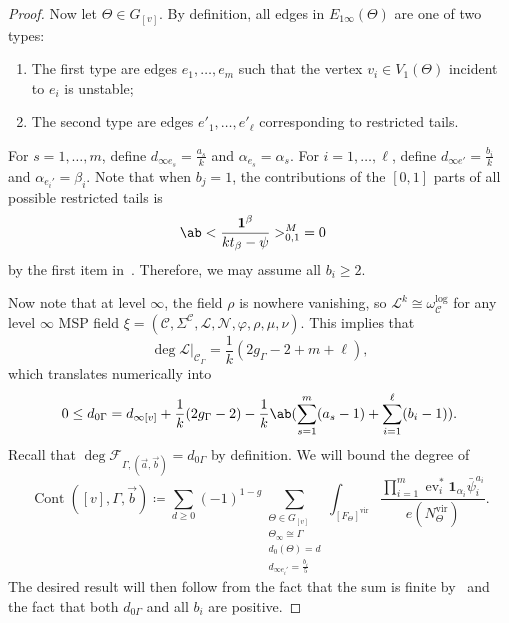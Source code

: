 \documentclass[10pt]{amsart}
\theoremstyle{definition}
\theoremstyle{remark}
\theoremstyle{plain}
\theoremstyle{definition}
\theoremstyle{remark}
\newcommand{\msc}[1]{\mathscr{#1}}
\newcommand{\mr}[1]{\mathrm{#1}}
\newcommand{\1}{\mathbf{1}}
\newcommand{\2}{\mathbf{2}}
\newcommand{\3}{\mathbf{3}}
\newcommand{\vir}{\mr{vir}}
\DeclareMathOperator{\ev}{ev}
\DeclareMathOperator{\Cont}{Cont}
\numberwithin{equation}{section}
\begin{document}
\begin{proof}
Now let $\Theta \in G_{[v]}$. By definition, all edges in $E_{1\infty}(\Theta)$ are one of two types:
\begin{enumerate}
    \item The first type are edges $e_1, \ldots, e_m$ such that the vertex $v_i \in V_1(\Theta)$ incident to $e_i$ is unstable;
    \item The second type are edges $e'_1, \ldots, e'_{\ell}$ corresponding to restricted tails.
\end{enumerate}

For $s=1, \ldots, m$, define $d_{\infty e_s} = \frac{a_s}{k}$ and $\alpha_{e_s} = \alpha_s$. For $i = 1, \ldots, \ell$, define $d_{\infty e'} = \frac{b_i}{k}$ and $\alpha_{e_i'} = \beta_i$. Note that when $b_j = 1$, the contributions of the $[0,1]$ parts of all possible restricted tails is
\begin{align*}
    \ab<\frac{\1^{\beta}}{k t_{\beta} - \psi}>_{0,1}^M  
    &= 0
\end{align*}
by the first item in~. Therefore, we may assume all $b_i \geq 2$.

Now note that at level $\infty$, the field $\rho$ is nowhere vanishing, so $\msc{L}^k \cong \omega_{\msc{C}}^{\log}$ for any level $\infty$ MSP field $\xi = (\msc{C}, \Sigma^{\msc{C}}, \msc{L}, \msc{N}, \varphi, \rho, \mu, \nu)$. This implies that
\[ \deg \msc{L}|_{\msc{C}_{\Gamma}} = \frac{1}{k}(2g_{\Gamma} -2 + m + \ell), \]
which translates numerically into
\begin{equation}\label{eqn:boundbs}
    0 \leq d_{0\Gamma} = d_{\infty[v]} + \frac{1}{k} (2g_{\Gamma}-2) - \frac{1}{k} \ab(\sum_{s=1}^m (a_s-1) + \sum_{i=1}^{\ell}(b_i-1)). 
\end{equation}
    Recall that $\deg \msc{F}_{\Gamma, (\vec{a}, \vec{b})} = d_{0\Gamma}$ by definition. We will bound the degree of
    \[ \Cont([v], \Gamma, \vec{b}) \coloneqq \sum_{d \geq 0} (-1)^{1-g} \sum_{\substack{\Theta \in G_{[v]} \\ \Theta_{\infty} \cong \Gamma \\ d_0(\Theta) = d \\ d_{\infty e_i'} = \frac{b_i}{5} }} \int_{[F_{\Theta}]^{\vir}} \frac{\prod_{i=1}^m \ev_i^* \1_{\alpha_i} \bar{\psi}_i^{a_i}}{e(N_{\Theta}^{\vir})}.\]
    The desired result will then follow from the fact that the sum is finite by~ and the fact that both $d_{0\Gamma}$ and all $b_i$ are positive.


\end{proof}
\end{document}
